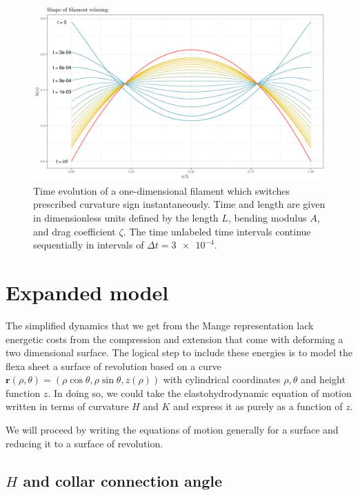\documentclass[draft]{article}
\begin{document}
\begin{figure}[bthp]
    \centering
    \includegraphics[width=\textwidth]{figures/shapes.png}
    \caption{Time evolution of a one-dimensional filament which switches prescribed curvature sign instantaneously. Time and length are given in dimensionless units defined by the length $L$, bending modulus $A$, and drag coefficient $\zeta$. The time unlabeled time intervals continue sequentially in intervals of $\Delta t = \num{3e-4}$.}
    \label{fig:shapes}
\end{figure}

\newpage 

\section{Expanded model}

The simplified dynamics that we get from the Mange representation lack energetic costs from the compression and extension that come with deforming a two dimensional surface. The logical step to include these energies is to model the flexa sheet a surface of revolution based on a curve $\bm{r}(\rho, \theta)=(\rho \cos \theta, \rho \sin \theta, z(\rho))$ with cylindrical coordinates $\rho, \theta$ and height function $z$. In doing so, we could take the elastohydrodynamic equation of motion written in terms of curvature $H$ and $K$ and express it as purely as a function of $z$.

We will proceed by writing the equations of motion generally for a surface and reducing it to a surface of revolution.

\subsection{$H$ and collar connection angle}
\end{document}
